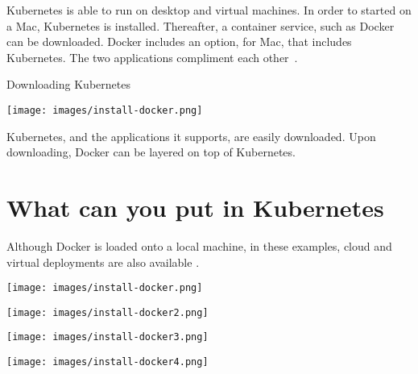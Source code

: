 Kubernetes is able to run on desktop and virtual machines.  In order
to started on a Mac, Kubernetes is installed.  Thereafter, a container
service, such as Docker can be downloaded.  Docker includes an option,
for Mac, that includes Kubernetes.  The two applications compliment
each other~\cite{hid-sp18-525-service}.  

Downloading Kubernetes


\texttt{[image: images/install-docker.png]}

Kubernetes, and the applications it supports, are easily downloaded.
Upon downloading, Docker can be layered on top of Kubernetes.   

\section{What can you put in Kubernetes}

Although Docker is loaded onto a local machine, in these examples,
cloud and virtual deployments are also available
\cite{hid-sp18-525-docker}. 


\texttt{[image: images/install-docker.png]}

\texttt{[image: images/install-docker2.png]}

\texttt{[image: images/install-docker3.png]}

\texttt{[image: images/install-docker4.png]}







